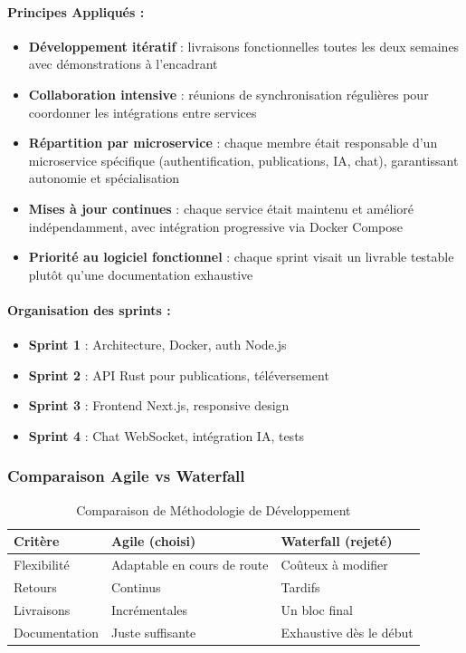 \documentclass{rapportPfe}
\begin{document}
\paragraph{Principes Appliqués :}
\begin{itemize}
    \item \textbf{Développement itératif} : livraisons fonctionnelles toutes les deux semaines avec démonstrations à l'encadrant
    \item \textbf{Collaboration intensive} : réunions de synchronisation régulières pour coordonner les intégrations entre services
    \item \textbf{Répartition par microservice} : chaque membre était responsable d’un microservice spécifique (authentification, publications, IA, chat), garantissant autonomie et spécialisation
    \item \textbf{Mises à jour continues} : chaque service était maintenu et amélioré indépendamment, avec intégration progressive via Docker Compose
    \item \textbf{Priorité au logiciel fonctionnel} : chaque sprint visait un livrable testable plutôt qu'une documentation exhaustive
\end{itemize}


\paragraph{Organisation des sprints :}
\begin{itemize}
    \item \textbf{Sprint 1} : Architecture, Docker, auth Node.js
    \item \textbf{Sprint 2} : API Rust pour publications, téléversement
    \item \textbf{Sprint 3} : Frontend Next.js, responsive design
    \item \textbf{Sprint 4} : Chat WebSocket, intégration IA, tests
\end{itemize}

\subsubsection{Comparaison Agile vs Waterfall}
\begin{table}[ht]
\centering
\begin{tabular}{|l|l|l|}
\hline
\textbf{Critère} & \textbf{Agile (choisi)} & \textbf{Waterfall (rejeté)} \\
\hline
Flexibilité & Adaptable en cours de route & Coûteux à modifier \\
\hline
Retours & Continus & Tardifs \\
\hline
Livraisons & Incrémentales & Un bloc final \\
\hline
Documentation & Juste suffisante & Exhaustive dès le début \\
\hline
\end{tabular}
\caption{Comparaison de Méthodologie de Développement}
\label{tab:compare-meth}
\end{table}
\end{document}
